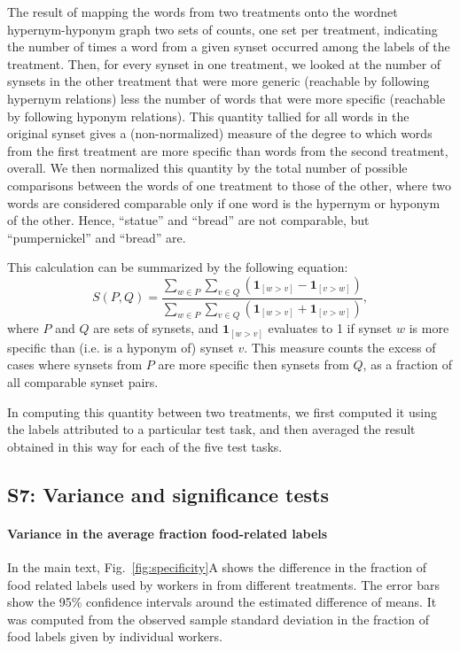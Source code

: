 \documentclass[12pt]{article}
\begin{document}
The result of mapping the words from two treatments onto the wordnet 
hypernym-hyponym graph two sets of counts, one set per treatment, 
indicating the number of times a word from a given synset occurred among the
labels of the treatment.  Then, for every synset in one treatment, we looked
at the number of synsets in the other treatment that were more generic
(reachable by following hypernym relations) less the number of words that
were more specific (reachable by following hyponym relations).  This quantity
tallied for all words in the original synset gives a (non-normalized) measure
of the degree to which words from the first treatment are more specific
than words from the second treatment, overall.  We then normalized this 
quantity by the total number of possible comparisons between the words of
one treatment to those of the other, where two words are considered comparable
only if one word is the hypernym or hyponym of the other.  Hence, ``statue'' 
and ``bread'' are not comparable, but ``pumpernickel'' and ``bread'' are.

This calculation can be summarized by the following equation:
\begin{equation}
	S(P,Q) = \frac{
		\sum_{w\in P}\sum_{v\in Q} \left(
			\mathbf{1}_{[w>v]} - \mathbf{1}_{[v>w]} \right)
	}{
		\sum_{w\in P}\sum_{v\in Q} \left(
			\mathbf{1}_{[w>v]} + \mathbf{1}_{[v>w]} \right)
	},
\end{equation}
where $P$ and $Q$ are sets of synsets, and $\mathbf{1}_{[w>v]}$ evaluates
to 1 if synset $w$ is more specific than (i.e. is a hyponym of) synset $v$.
This measure counts the excess of cases where synsets from $P$ are more
specific then synsets from $Q$, as a fraction of all comparable synset pairs. 

In computing this quantity between two treatments, we first computed it 
using the labels attributed to a particular test task, and then
averaged the result obtained in this way for each of the five test tasks.

\subsection*{S7: Variance and significance tests}

	\paragraph{Variance in the average fraction food-related labels}
	In the main text, Fig.~\ref{fig:specificity}A shows the difference in 
	the fraction of food related labels used by workers in from different 
	treatments.  The error bars show the 95\% confidence intervals around 
	the estimated difference of means.  It was computed from the
	observed sample standard deviation in the fraction of food labels given
	by individual workers.
\end{document}
